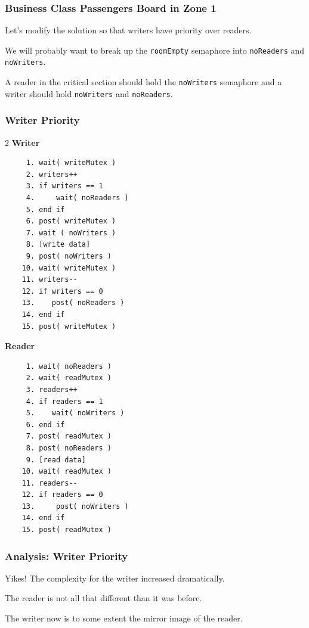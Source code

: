 \begin{frame}
	\frametitle{Business Class Passengers Board in Zone 1}

	Let's modify the solution so that writers have priority over readers.

	We will probably want to break up the \texttt{roomEmpty} semaphore into \texttt{noReaders} and \texttt{noWriters}.

	A reader in the critical section should hold the \texttt{noWriters} semaphore and a writer should hold \texttt{noWriters} and \texttt{noReaders}.

\end{frame}


\begin{frame}[fragile]
	\frametitle{Writer Priority}

	\begin{multicols}{2}
		\textbf{Writer}\vspace{-1em}
		\begin{verbatim}
     1. wait( writeMutex )
     2. writers++
     3. if writers == 1
     4.     wait( noReaders )
     5. end if
     6. post( writeMutex )
     7. wait ( noWriters )
     8. [write data]
     9. post( noWriters ) 
    10. wait( writeMutex )
    11. writers--
    12. if writers == 0
    13.    post( noReaders )
    14. end if
    15. post( writeMutex )     
  \end{verbatim}
		\columnbreak
		\textbf{Reader}\vspace{-2em}
		\begin{verbatim}
     1. wait( noReaders )
     2. wait( readMutex )
     3. readers++
     4. if readers == 1
     5.    wait( noWriters )
     6. end if
     7. post( readMutex )
     8. post( noReaders )
     9. [read data]
    10. wait( readMutex )
    11. readers--
    12. if readers == 0
    13.     post( noWriters )
    14. end if
    15. post( readMutex )
\end{verbatim}
	\end{multicols}
	\vspace{-2em}

\end{frame}


\begin{frame}
	\frametitle{Analysis: Writer Priority}

	Yikes! The complexity for the writer increased dramatically.

	The reader is not all that different than it was before.

	The writer now is to some extent the mirror image of the reader.

\end{frame}


